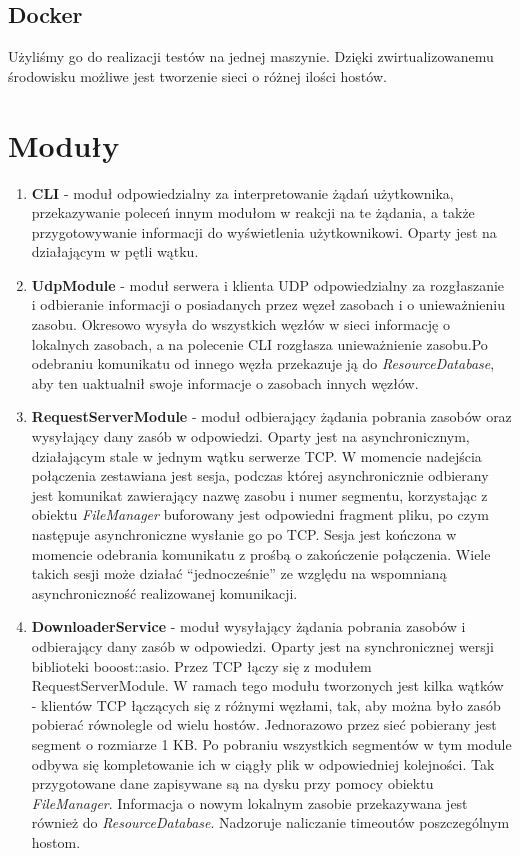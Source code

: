 \documentclass[11pt,oneside]{book}
\newcommand{\+}{\discretionary{\mbox{\scriptsize$\hookleftarrow$}}{}{}}
\begin{document}
\subsection{Docker}
Użyliśmy go do realizacji testów na jednej maszynie. Dzięki zwirtualizowanemu środowisku możliwe jest tworzenie sieci o różnej ilości hostów.
\section{Moduły}
\begin{enumerate}
	\item 
\textbf{CLI} - moduł odpowiedzialny za interpretowanie żądań użytkownika, przekazywanie poleceń innym modułom w reakcji na te żądania, a także przygotowywanie informacji do wyświetlenia użytkownikowi. Oparty jest na działającym w pętli wątku.
	\item 
\textbf{UdpModule} - moduł serwera i klienta UDP odpowiedzialny za rozgłaszanie i odbieranie informacji o posiadanych przez węzeł zasobach i o unieważnieniu zasobu. Okresowo wysyła do wszystkich węzłów w sieci informację o lokalnych zasobach, a na polecenie CLI rozgłasza unieważnienie zasobu.Po odebraniu komunikatu od innego węzła przekazuje ją do \textit{ResourceDatabase}, aby ten uaktualnił swoje informacje o zasobach innych węzłów.
	\item 
\textbf{RequestServerModule} - moduł odbierający żądania pobrania zasobów oraz wysyłający dany zasób w odpowiedzi. Oparty jest na asynchronicznym, działającym stale w jednym wątku serwerze TCP. W momencie nadejścia połączenia zestawiana jest sesja, podczas której asynchronicznie odbierany jest komunikat zawierający nazwę zasobu i numer segmentu, korzystając z obiektu \textit{FileManager} buforowany jest odpowiedni fragment pliku, po czym następuje asynchroniczne wysłanie go po TCP. Sesja jest kończona w momencie odebrania komunikatu z prośbą o zakończenie połączenia. Wiele takich sesji może działać “jednocześnie” ze względu na wspomnianą asynchroniczność realizowanej komunikacji.
	\item 
\textbf{DownloaderService} - moduł wysyłający żądania pobrania zasobów i odbierający dany zasób w odpowiedzi. Oparty jest na synchronicznej wersji biblioteki booost::asio. Przez TCP łączy się z modułem RequestServerModule. W ramach tego modułu tworzonych jest kilka wątków - klientów TCP łączących się z różnymi węzłami, tak, aby można było zasób pobierać równolegle od wielu hostów. Jednorazowo przez sieć pobierany jest segment o rozmiarze 1 KB. Po pobraniu wszystkich segmentów w tym module odbywa się kompletowanie ich w ciągły plik w odpowiedniej kolejności. Tak przygotowane dane zapisywane są na dysku przy pomocy obiektu \textit{FileManager}. Informacja o nowym lokalnym zasobie przekazywana jest również do \textit{ResourceDatabase}. Nadzoruje naliczanie timeoutów poszczególnym hostom.

\end{enumerate}
\end{document}
